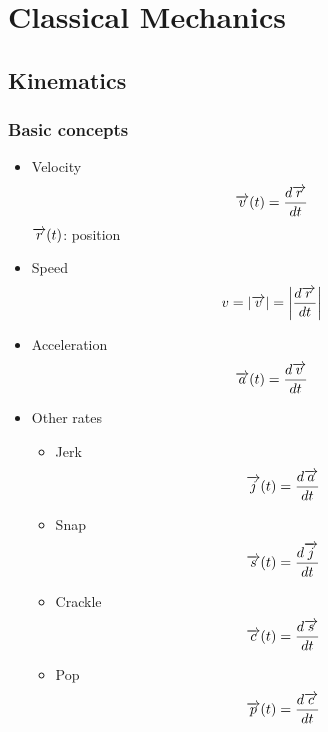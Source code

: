 \chapter{Classical Mechanics}
\section{Kinematics}
    \subsection{Basic concepts}
        \begin{itemize}
            \item Velocity
                \begin{equation*}
                    \overrightarrow{v}(t)=\frac{d\overrightarrow{r}}{dt}
                \end{equation*}
                $\overrightarrow{r}(t)$: position
            \item Speed
                \begin{equation*}
                    v=\left|\overrightarrow{v}\right|=\left|\frac{d\overrightarrow{r}}{dt}\right|
                \end{equation*}
            \item Acceleration
                \begin{equation*}
                    \overrightarrow{a}(t)=\dfrac{d\overrightarrow{v}}{dt}
                \end{equation*}
            \item Other rates
                \begin{itemize}
                    \item Jerk
                        \begin{equation*}
                            \overrightarrow{j}(t)=\dfrac{d\overrightarrow{a}}{dt}
                        \end{equation*}
                    \item Snap
                        \begin{equation*}
                            \overrightarrow{s}(t)=\dfrac{d\overrightarrow{j}}{dt}
                        \end{equation*}
                    \item Crackle
                        \begin{equation*}
                            \overrightarrow{c}(t)=\dfrac{d\overrightarrow{s}}{dt}
                        \end{equation*}
                    \item Pop
                        \begin{equation*}
                            \overrightarrow{p}(t)=\dfrac{d\overrightarrow{c}}{dt}
                        \end{equation*}
                \end{itemize}
        \end{itemize}
